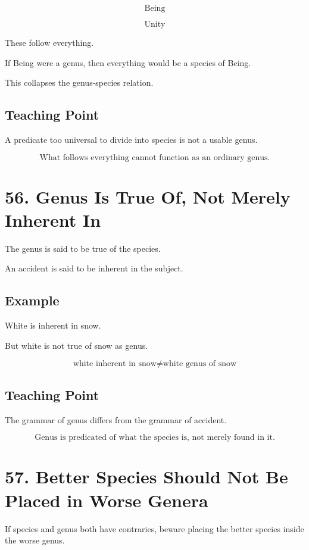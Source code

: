 \documentclass[12pt]{article}
\begin{document}
\[
\text{Being}
\]

\[
\text{Unity}
\]

These follow everything.

If Being were a genus, then everything would be a species of Being.

This collapses the genus-species relation.

\subsection*{Teaching Point}

A predicate too universal to divide into species is not a usable genus.

\[
\boxed{
\text{What follows everything cannot function as an ordinary genus.}
}
\]

\section*{56. Genus Is True Of, Not Merely Inherent In}

The genus is said to be true of the species.

An accident is said to be inherent in the subject.

\subsection*{Example}

White is inherent in snow.

But white is not true of snow as genus.

\[
\text{white inherent in snow} \neq \text{white genus of snow}
\]

\subsection*{Teaching Point}

The grammar of genus differs from the grammar of accident.

\[
\boxed{
\text{Genus is predicated of what the species is, not merely found in it.}
}
\]

\section*{57. Better Species Should Not Be Placed in Worse Genera}

If species and genus both have contraries, beware placing the better species
inside the worse genus.
\end{document}
